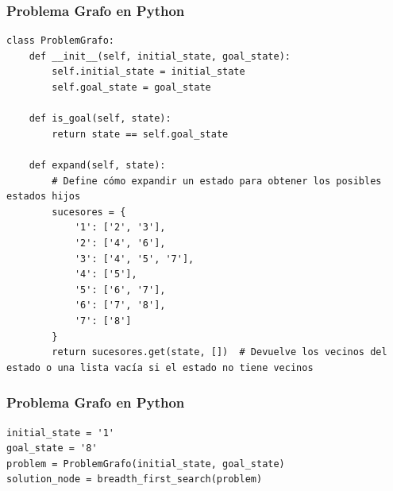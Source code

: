 \documentclass[xcolor=table]{beamer}
\begin{document}
\begin{frame} [fragile ]\frametitle{Problema Grafo  en Python } \footnotesize
\begin{verbatim}
class ProblemGrafo:
    def __init__(self, initial_state, goal_state):
        self.initial_state = initial_state
        self.goal_state = goal_state

    def is_goal(self, state):
        return state == self.goal_state

    def expand(self, state):
        # Define cómo expandir un estado para obtener los posibles estados hijos
        sucesores = { 
            '1': ['2', '3'],
            '2': ['4', '6'],
            '3': ['4', '5', '7'],
            '4': ['5'],
            '5': ['6', '7'],
            '6': ['7', '8'],
            '7': ['8']
        }
        return sucesores.get(state, [])  # Devuelve los vecinos del estado o una lista vacía si el estado no tiene vecinos

\end{verbatim}

\end{frame} 

\begin{frame} [fragile ]\frametitle{Problema Grafo  en Python } \small
\begin{verbatim}
initial_state = '1'
goal_state = '8'
problem = ProblemGrafo(initial_state, goal_state)
solution_node = breadth_first_search(problem)

\end{verbatim}

\end{frame} 
\end{document}
